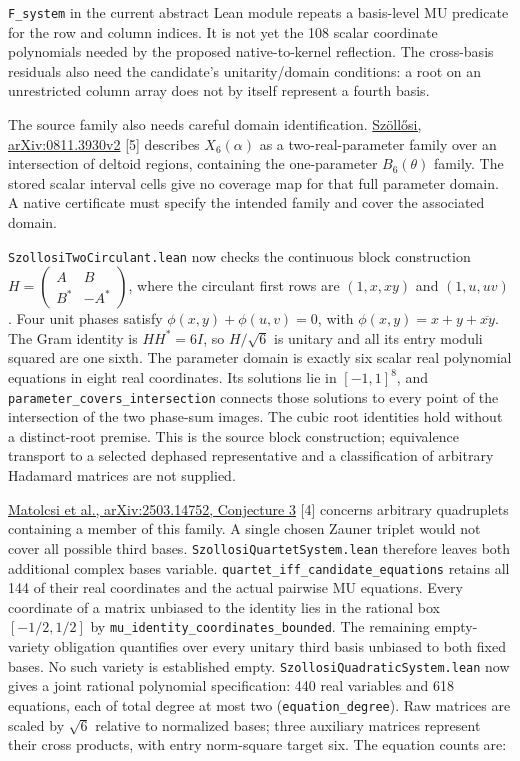 \documentclass[
]{article}
\begin{document}
\nolinkurl{F_system} in the current abstract Lean module repeats a
basis-level MU predicate for the row and column indices. It is not yet
the 108 scalar coordinate polynomials needed by the proposed
native-to-kernel reflection. The cross-basis residuals also need the
candidate's unitarity/domain conditions: a root on an unrestricted
column array does not by itself represent a fourth basis.

The source family also needs careful domain identification.
\href{https://arxiv.org/pdf/0811.3930v2}{Szöllősi, arXiv:0811.3930v2}
{[}5{]} describes \(X_6(\alpha)\) as a two-real-parameter family over an
intersection of deltoid regions, containing the one-parameter
\(B_6(\theta)\) family. The stored scalar interval cells give no
coverage map for that full parameter domain. A native certificate must
specify the intended family and cover the associated domain.

\nolinkurl{SzollosiTwoCirculant.lean} now checks the continuous block
construction \(H=\begin{pmatrix}A&B\\B^*&-A^*\end{pmatrix}\), where the
circulant first rows are \((1,x,xy)\) and \((1,u,uv)\). Four unit phases
satisfy \(\phi(x,y)+\phi(u,v)=0\), with \(\phi(x,y)=x+y+\overline{xy}\).
The Gram identity is \(HH^*=6I\), so \(H/\sqrt6\) is unitary and all its
entry moduli squared are one sixth. The parameter domain is exactly six
scalar real polynomial equations in eight real coordinates. Its
solutions lie in \([-1,1]^8\), and
\nolinkurl{parameter_covers_intersection} connects those solutions to
every point of the intersection of the two phase-sum images. The cubic
root identities hold without a distinct-root premise. This is the source
block construction; equivalence transport to a selected dephased
representative and a classification of arbitrary Hadamard matrices are
not supplied.

\href{https://arxiv.org/pdf/2503.14752}{Matolcsi et al.,
arXiv:2503.14752, Conjecture 3} {[}4{]} concerns arbitrary quadruplets
containing a member of this family. A single chosen Zauner triplet would
not cover all possible third bases.
\nolinkurl{SzollosiQuartetSystem.lean} therefore leaves both additional
complex bases variable. \nolinkurl{quartet_iff_candidate_equations}
retains all 144 of their real coordinates and the actual pairwise MU
equations. Every coordinate of a matrix unbiased to the identity lies in
the rational box \([-1/2,1/2]\) by
\nolinkurl{mu_identity_coordinates_bounded}. The remaining empty-variety
obligation quantifies over every unitary third basis unbiased to both
fixed bases. No such variety is established empty.
\nolinkurl{SzollosiQuadraticSystem.lean} now gives a joint rational
polynomial specification: 440 real variables and 618 equations, each of
total degree at most two (\nolinkurl{equation_degree}). Raw matrices are
scaled by \(\sqrt6\) relative to normalized bases; three auxiliary
matrices represent their cross products, with entry norm-square target
six. The equation counts are:
\end{document}
